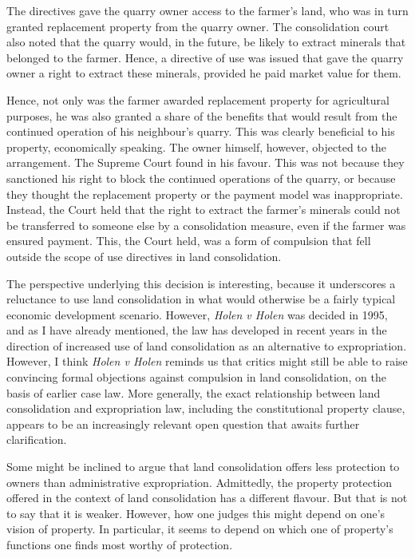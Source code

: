 The directives gave the quarry owner access to the farmer's land, who was in turn granted replacement property from the quarry owner. The consolidation court also noted that the quarry would, in the future, be likely to extract minerals that belonged to the farmer. Hence, a directive of use was issued that gave the quarry owner a right to extract these minerals, provided he paid market value for them. 

Hence, not only was the farmer awarded replacement property for agricultural purposes, he was also granted a share of the benefits that would result from the continued operation of his neighbour's quarry. This was clearly beneficial to his property, economically speaking. The owner himself, however, objected to the arrangement. The Supreme Court found in his favour. This was not because they sanctioned his right to block the continued operations of the quarry, or because they thought the replacement property or the payment model was inappropriate. Instead, the Court held that the right to extract the farmer's minerals could not be transferred to someone else by a consolidation measure, even if the farmer was ensured payment. This, the Court held, was a form of compulsion that fell outside the scope of use directives in land consolidation.

The perspective underlying this decision is interesting, because it underscores a reluctance to use land consolidation in what would otherwise be a fairly typical economic development scenario. However, {\it Holen v Holen} was decided in 1995, and as I have already mentioned, the law has developed in recent years in the direction of increased use of land consolidation as an alternative to expropriation. However, I think {\it Holen v Holen} reminds us that critics might still be able to raise convincing formal objections against compulsion in land consolidation, on the basis of earlier case law. More generally, the exact relationship between land consolidation and expropriation law, including the constitutional property clause, appears to be an increasingly relevant open question that awaits further clarification.

Some might be inclined to argue that land consolidation offers less protection to owners than administrative expropriation. Admittedly, the property protection offered in the context of land consolidation has a different flavour. But that is not to say that it is weaker. However, how one judges this might depend on one's vision of property. In particular, it seems to depend on which one of property's functions one finds most worthy of protection.

